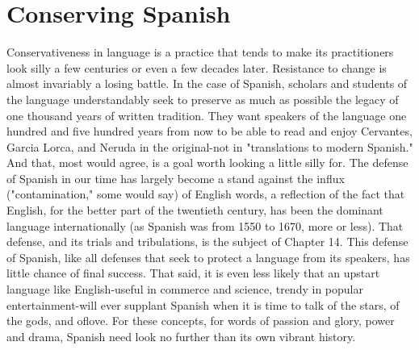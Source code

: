 \section{Conserving Spanish}

Conservativeness in language is a practice that tends to make
its practitioners look silly a few centuries or even a few decades later.
Resistance to change is almost invariably a losing battle. In the case of
Spanish, scholars and students of the language understandably seek to
preserve as much as possible the legacy of one thousand years of written tradition. They want speakers of the language one hundred and five
hundred years from now to be able to read and enjoy Cervantes, Garcia
Lorca, and Neruda in the original-not in "translations to modern
Spanish." And that, most would agree, is a goal worth looking a little
silly for.
The defense of Spanish in our time has largely become a stand
against the influx ("contamination," some would say) of English words,
a reflection of the fact that English, for the better part of the twentieth
century, has been the dominant language internationally (as Spanish
was from 1550 to 1670, more or less). That defense, and its trials and
tribulations, is the subject of Chapter 14.
This defense of Spanish, like all defenses that seek to protect a
language from its speakers, has little chance of final success. That said,
it is even less likely that an upstart language like English-useful in
commerce and science, trendy in popular entertainment-will ever
supplant Spanish when it is time to talk of the stars, of the gods, and
oflove. For these concepts, for words of passion and glory, power and
drama, Spanish need look no further than its own vibrant history.

